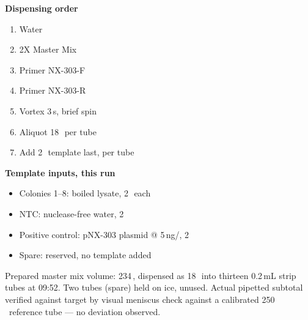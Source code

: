 \vspace{6pt}
\noindent
\begin{minipage}[t]{0.48\linewidth}
\begin{fieldbox}
\textbf{\color{pcrforest}Dispensing order}
\begin{enumerate}[label=\arabic*.]
  \item Water
  \item 2X Master Mix
  \item Primer NX-303-F
  \item Primer NX-303-R
  \item Vortex 3\,s, brief spin
  \item Aliquot 18\,\uL\ per tube
  \item Add 2\,\uL\ template last, per tube
\end{enumerate}
\end{fieldbox}
\end{minipage}\hfill
\begin{minipage}[t]{0.48\linewidth}
\begin{fieldbox}
\textbf{\color{pcrforest}Template inputs, this run}
\begin{itemize}
  \item Colonies 1--8: boiled lysate, 2\,\uL\ each
  \item NTC: nuclease-free water, 2\,\uL
  \item Positive control: pNX-303 plasmid @ 5\,ng/\uL, 2\,\uL
  \item Spare: reserved, no template added
\end{itemize}
\end{fieldbox}
\end{minipage}
\par

\begin{notebox}
Prepared master mix volume: 234\,\uL, dispensed as 18\,\uL\ into thirteen 0.2\,mL strip tubes at
09:52. Two tubes (spare) held on ice, unused. Actual pipetted subtotal verified against target by
visual meniscus check against a calibrated 250\,\uL\ reference tube --- no deviation observed.
\end{notebox}
